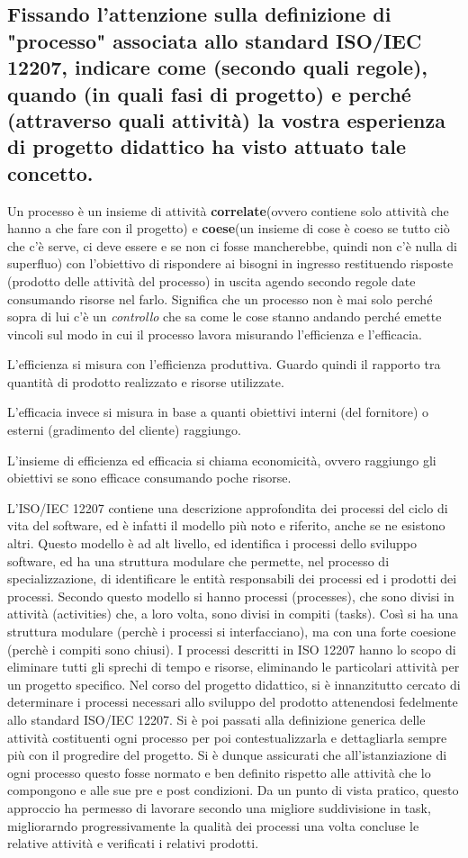 \subsection{Fissando l'attenzione sulla definizione di "processo" associata allo standard ISO/IEC 12207, indicare come (secondo quali regole), quando (in quali fasi di progetto) e perché (attraverso quali attività) la vostra esperienza di progetto didattico ha visto attuato tale concetto.}

Un processo è un insieme di attività \textbf{correlate}(ovvero contiene solo attività che hanno a che fare con il progetto)  e \textbf{coese}(un insieme di cose è coeso se tutto ciò che c’è serve, ci deve essere e se non ci fosse mancherebbe, quindi non c'è nulla di superfluo) con l'obiettivo di rispondere ai bisogni in ingresso restituendo risposte (prodotto delle attività del processo) in uscita agendo secondo regole date consumando risorse nel farlo. Significa che un processo non è mai solo perché sopra di lui c’è un \textit{controllo} che sa come le cose stanno andando perché emette vincoli sul modo in cui il processo lavora misurando l'efficienza e l'efficacia.

L'efficienza si misura con l’efficienza produttiva. Guardo quindi il rapporto tra quantità di prodotto realizzato e risorse utilizzate.

L'efficacia invece si misura in base a quanti obiettivi interni (del fornitore) o esterni (gradimento del cliente) raggiungo.

L’insieme di efficienza ed efficacia si chiama economicità, ovvero raggiungo gli obiettivi se sono efficace consumando poche risorse.

L'ISO/IEC 12207 contiene una descrizione approfondita dei processi del ciclo di vita del software, ed è infatti il modello più noto e riferito, anche se ne esistono altri. Questo modello è ad alt livello, ed identifica i processi dello sviluppo software, ed ha una struttura modulare che permette, nel processo di specializzazione, di identificare le entità responsabili dei processi ed i prodotti dei processi.
Secondo questo modello si hanno processi (processes), che sono divisi in attività (activities) che, a loro volta, sono divisi in compiti (tasks). Così si ha una struttura modulare (perchè i processi si interfacciano), ma con una forte coesione (perchè i compiti sono chiusi). I processi descritti in ISO 12207  hanno lo scopo di eliminare tutti gli sprechi di tempo e risorse, eliminando le particolari attività per un progetto specifico.
Nel corso del progetto didattico, si è innanzitutto cercato di determinare i processi necessari allo sviluppo del prodotto attenendosi fedelmente allo standard ISO/IEC 12207. Si è poi passati alla definizione generica delle attività costituenti ogni processo per poi contestualizzarla e dettagliarla sempre più con il progredire del progetto. Si è dunque assicurati che all’istanziazione di ogni processo questo fosse normato e ben definito rispetto alle attività che lo compongono e alle sue pre e post condizioni. Da un punto di vista pratico, questo approccio ha permesso di lavorare secondo una migliore suddivisione in task, migliorarndo progressivamente la qualità dei processi una volta concluse le relative attività e verificati i relativi prodotti.